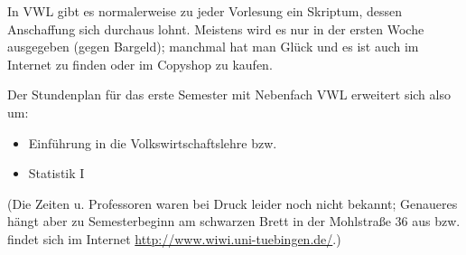 In VWL gibt es normalerweise zu jeder Vorlesung ein Skriptum, dessen Anschaffung
sich durchaus lohnt. Meistens wird es nur in der ersten Woche ausgegeben (gegen
Bargeld); manchmal hat man Glück und es ist auch im Internet zu finden
 oder im Copyshop zu kaufen.

Der Stundenplan für das erste Semester mit Nebenfach VWL erweitert
sich also um:

\begin{itemize}
\item Einführung in die Volkswirtschaftslehre
bzw.
\item Statistik I
\end{itemize}

(Die Zeiten u. Professoren waren bei Druck leider noch nicht bekannt;
Genaueres hängt aber zu Semesterbeginn am schwarzen Brett in der
Mohlstraße 36 aus bzw. findet sich im Internet \url{http://www.wiwi.uni-tuebingen.de/}.)
